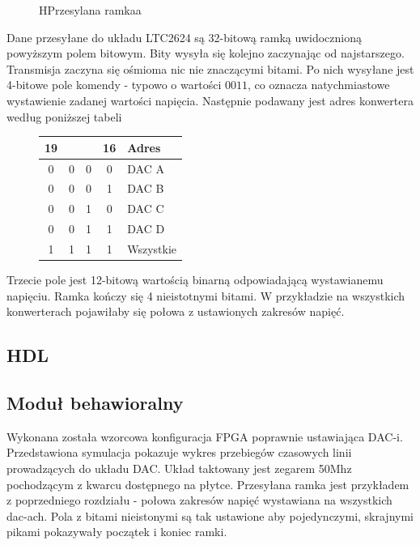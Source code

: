 \documentclass[a4paper,12pt]{article}
\begin{document}
\begin{figure}[htb]
  \centering
	\begin{register}{H}{Przesylana ramka}{a}
	\label{dacprotocol}%
	\end{register}
\end{figure}

Dane przesyłane do układu LTC2624 są 32-bitową ramką uwidocznioną powyższym polem bitowym. Bity wysyła się kolejno zaczynając od najstarszego. Transmisja zaczyna się ośmioma nic nie znaczącymi bitami. Po nich wysyłane jest 4-bitowe pole komendy - typowo o wartości $0011$, co oznacza natychmiastowe wystawienie zadanej wartości napięcia. Następnie podawany jest adres konwertera według poniższej tabeli

\begin{figure}[htb]
  \centering
	\begin{tabular}{|c|c|c|c|l|}
	  \multicolumn{1}{r}{19}&\multicolumn{1}{r}{}&\multicolumn{1}{r}{}&\multicolumn{1}{r}{16}&\multicolumn{1}{l}{Adres}\\
		\hline
		0&0&0&0 & DAC A\\
		\hline
		0&0&0&1 & DAC B\\
		\hline
		0&0&1&0 & DAC C\\
		\hline
		0&0&1&1 & DAC D\\
		\hline
		1&1&1&1 & Wszystkie\\
		\hline
	\end{tabular}
\end{figure}

Trzecie pole jest 12-bitową wartością binarną odpowiadającą wystawianemu napięciu. Ramka kończy się 4 nieistotnymi bitami. W przykładzie na wszystkich konwerterach pojawiłaby się połowa z ustawionych zakresów napięć.



\subsection{HDL}




\subsection{Moduł behawioralny}
Wykonana została wzorcowa konfiguracja FPGA poprawnie ustawiająca DAC-i. Przedstawiona symulacja pokazuje wykres przebiegów czasowych linii prowadzących do układu DAC. Układ taktowany jest zegarem 50Mhz pochodzącym z kwarcu dostępnego na płytce. Przesyłana ramka jest przykładem z poprzedniego rozdziału - połowa zakresów napięć wystawiana na wszystkich dac-ach. Pola z bitami nieistonymi są tak ustawione aby pojedynczymi, skrajnymi pikami pokazywały początek i koniec ramki.
\end{document}
